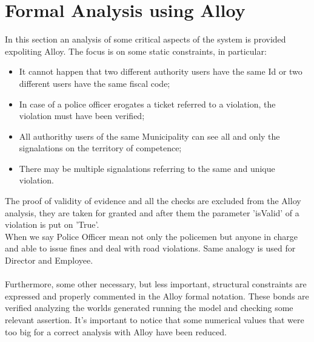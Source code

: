 \documentclass{article}
\begin{document}
\newpage
\section{Formal Analysis using Alloy}
In this section an analysis of some critical aspects of the system is provided
expoliting Alloy. The focus is on some static constraints, in particular:

\begin{itemize}
    \item It cannot happen that two different authority users have the same Id
    or two different users have the same fiscal code;
    \item In case of a police officer erogates a ticket referred to a violation,
    the violation must have been verified;
    \item All authorithy users of the same Municipality can see all and only the
    signalations on the territory of competence;
    \item There may be multiple signalations referring to the same and unique
    violation.
\end{itemize}

The proof of validity of evidence and all the checks are excluded from the Alloy
analysis, they are taken for granted and after them the parameter 'isValid' of a
violation is put on 'True'.\\
When we say Police Officer mean not only the policemen but anyone in charge and
able to issue fines and deal with road violations. Same analogy is used for
Director and Employee.\\
\\
Furthermore, some other necessary, but less important, structural constraints
are expressed and properly commented in the Alloy formal notation. These bonds
are verified analyzing the worlds generated running the model and checking some
relevant assertion. It's important to notice that some numerical values that
were too big for a correct analysis with Alloy have been reduced. 
\newpage


\newpage
\end{document}
